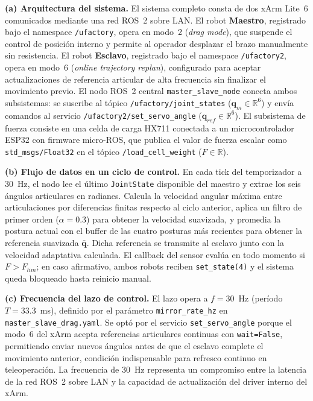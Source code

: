 \documentclass[journal,10pt,twoside]{IEEEtran}
\begin{document}
\textbf{(a) Arquitectura del sistema.}
El sistema completo consta de dos xArm Lite~6 comunicados mediante
una red ROS~2 sobre LAN. El robot \textbf{Maestro}, registrado bajo
el namespace \texttt{/ufactory}, opera en modo~2
(\textit{drag mode}), que suspende el control de posición interno y
permite al operador desplazar el brazo manualmente sin resistencia.
El robot \textbf{Esclavo}, registrado bajo el namespace
\texttt{/ufactory2}, opera en modo~6
(\textit{online trajectory replan}), configurado para aceptar
actualizaciones de referencia articular de alta frecuencia sin
finalizar el movimiento previo. El nodo ROS~2 central
\texttt{master\_slave\_node} conecta ambos subsistemas:
se suscribe al tópico \texttt{/ufactory/joint\_states}
($\bm{q}_m \in \mathbb{R}^6$) y envía comandos al servicio
\texttt{/ufactory2/set\_servo\_angle}
($\bm{q}_{ref} \in \mathbb{R}^6$). El subsistema de fuerza
consiste en una celda de carga HX711 conectada a un
microcontrolador ESP32 con firmware micro-ROS, que publica el
valor de fuerza escalar como \texttt{std\_msgs/Float32} en el
tópico \texttt{/load\_cell\_weight} ($F \in \mathbb{R}$).

\textbf{(b) Flujo de datos en un ciclo de control.}
En cada tick del temporizador a 30~Hz, el nodo lee el último
\texttt{JointState} disponible del maestro y extrae los seis
ángulos articulares en radianes. Calcula la velocidad angular
máxima entre articulaciones por diferencias finitas respecto al
ciclo anterior, aplica un filtro de primer orden ($\alpha{=}0.3$)
para obtener la velocidad suavizada, y promedia la postura actual
con el buffer de las cuatro posturas más recientes para obtener la
referencia suavizada $\bar{\bm{q}}$. Dicha referencia se transmite
al esclavo junto con la velocidad adaptativa calculada. El callback
del sensor evalúa en todo momento si $F > F_{lim}$; en caso
afirmativo, ambos robots reciben \texttt{set\_state(4)} y el
sistema queda bloqueado hasta reinicio manual.

\textbf{(c) Frecuencia del lazo de control.}
El lazo opera a $f{=}30$~Hz (período $T{=}33.3$~ms), definido por
el parámetro \texttt{mirror\_rate\_hz} en
\texttt{master\_slave\_drag.yaml}. Se optó por el servicio
\texttt{set\_servo\_angle} porque el modo~6 del xArm acepta
referencias articulares continuas con \texttt{wait=False},
permitiendo enviar nuevos ángulos antes de que el esclavo complete
el movimiento anterior, condición indispensable para refresco
continuo en teleoperación. La frecuencia de 30~Hz representa un
compromiso entre la latencia de la red ROS~2 sobre LAN y la
capacidad de actualización del driver interno del xArm.
\end{document}
